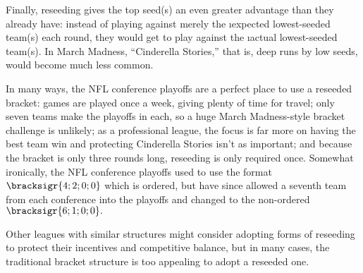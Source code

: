 {    Finally, reseeding gives the top seed(s) an even greater advantage than they already have: instead of playing against merely the \i{expected} lowest-seeded team(s) each round, they would get to play against the \i{actual} lowest-seeded team(s). In March Madness, ``Cinderella Stories,'' that is, deep runs by low seeds, would become much less common.

    In many ways, the NFL conference playoffs are a perfect place to use a reseeded bracket: games are played once a week, giving plenty of time for travel; only seven teams make the playoffs in each, so a huge March Madness-style bracket challenge is unlikely; as a professional league, the focus is far more on having the best team win and protecting Cinderella Stories isn't as important; and because the bracket is only three rounds long, reseeding is only required once. Somewhat ironically, the NFL conference playoffs used to use the format $\bracksigr{4;2;0;0}$ which is ordered, but have since allowed a seventh team from each conference into the playoffs and changed to the non-ordered $\bracksigr{6;1;0;0}.$ 

    Other leagues with similar structures might consider adopting forms of reseeding to protect their incentives and competitive balance, but in many cases, the traditional bracket structure is too appealing to adopt a reseeded one.

    }
